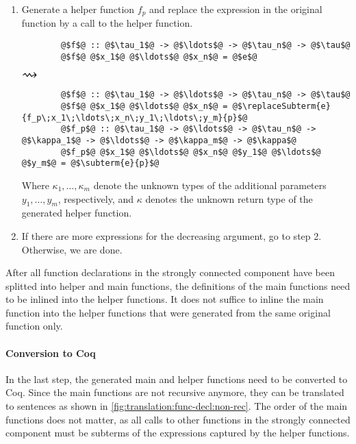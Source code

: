 \begin{enumerate}
  \item
  Generate a helper function $f_p$ and replace the  expression in the original function by a call to the helper function.
  \begin{center}
    \begin{minipage}[t]{0.3\textwidth}
      \begin{verbatim}
        @$f$@ :: @$\tau_1$@ -> @$\ldots$@ -> @$\tau_n$@ -> @$\tau$@
        @$f$@ @$x_1$@ @$\ldots$@ @$x_n$@ = @$e$@
      \end{verbatim}
    \end{minipage}
    \begin{minipage}[c]{0.05\textwidth}
      $\mathlarger{\mathlarger{\mathlarger{\rightsquigarrow}}}$
    \end{minipage}
    \begin{minipage}[t]{0.5\textwidth}
      \begin{verbatim}
        @$f$@ :: @$\tau_1$@ -> @$\ldots$@ -> @$\tau_n$@ -> @$\tau$@
        @$f$@ @$x_1$@ @$\ldots$@ @$x_n$@ = @$\replaceSubterm{e}{f_p\;x_1\;\ldots\;x_n\;y_1\;\ldots\;y_m}{p}$@
        @$f_p$@ :: @$\tau_1$@ -> @$\ldots$@ -> @$\tau_n$@ -> @$\kappa_1$@ -> @$\ldots$@ -> @$\kappa_m$@ -> @$\kappa$@
        @$f_p$@ @$x_1$@ @$\ldots$@ @$x_n$@ @$y_1$@ @$\ldots$@ @$y_m$@ = @$\subterm{e}{p}$@
      \end{verbatim}
    \end{minipage}
  \end{center}
  Where $\kappa_1, \ldots, \kappa_m$ denote the unknown types of the additional parameters $y_1, \ldots, y_m$, respectively, and $\kappa$ denotes the unknown return type of the generated helper function.

  \item
  If there are more  expressions for the decreasing argument, go to step 2.
  Otherwise, we are done.
\end{enumerate}

After all function declarations in the strongly connected component have been splitted into helper and main functions, the definitions of the main functions need to be inlined into the helper functions.
It does not suffice to inline the main function into the helper functions that were generated from the same original function only.

\paragraph{Conversion to Coq}
In the last step, the generated main and helper functions need to be converted to Coq.
Since the main functions are not recursive anymore, they can be translated to  sentences as shown in \autoref{fig:translation:func-decl:non-rec}.
The order of the main functions does not matter, as all calls to other functions in the strongly connected component must be subterms of the  expressions captured by the helper functions.

